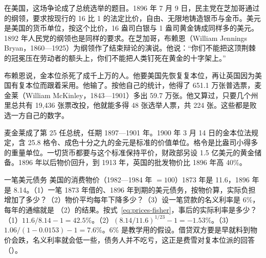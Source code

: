
在美国，这场争论成了总统选举的题目。1896 年 7 月 9 日，民主党在芝加哥通过的纲领，要求按现行的 16 比 1 的法定比价，自由、无限地铸造银币与金币\cite{bryan1896}。美元是美国的货币单位，按这个比价，16 盎司白银与 1 盎司黄金铸成同样多的美元。1892 年人民党的纲领也是同样的要求\cite{bryan1896}。在芝加哥，布赖恩（William Jennings Bryan，1860—1925）为纲领作了结束辩论的演说\cite{bryan1896,wikisourceauthors}。他说：“你们不能把这顶荆棘的冠冕压在劳动者的额头上，你们不能把人类钉死在黄金的十字架上。”\cite{bryan1896}

布赖恩说，金本位杀死了成千上万的人\cite{bryan1896}。他要美国先恢复复本位，再让英国因为美国有复本位而跟着采用\cite{bryan1896}。他输了。按他自己的统计，他得了 651.1 万张普选票，麦金莱（William McKinley，1843—1901）多出 59.7 万张\cite{bryan1896,wikisourceauthors}。他又算过，只要几个州里总共有 19,436 张票改投，他就能多得 48 张选举人票，共 224 张\cite{bryan1896}。这些都是败选一方自己的数字。

麦金莱成了第 25 任总统，任期 1897—1901 年\cite{wikisourceauthors}。1900 年 3 月 14 日的金本位法规定，含 25.8 格令、成色十分之九的金元是标准的价值单位\cite{huntington1910}。格令是比盎司小得多的重量单位。一切货币都要与这个标准保持平价，财政部另设 1.5 亿美元的黄金储备\cite{huntington1910}。1896 年以后物价回升，到 1913 年，英国的批发物价比 1896 年高 40\%\cite{boe2017}。

\begin{example}{一笔美元债务}\label{ex:gold-debt}
美国的消费物价（1982—1984 年 $=100$）1873 年是 11.6，1896 年是 8.14\cite{boe2017}。（1）一笔 1873 年借的、1896 年到期的美元债务，按物价算，实际负担增加了多少？（2）物价平均每年下降多少？（3）设一笔贷款的名义利率是 6\%，每年的通缩就是 （2）的结果。按式~\eqref{eq:prices-fisher}，事后的实际利率是多少？
\solution （1）$11.6/8.14-1=42.5\%$。（2）$(8.14/11.6)^{1/23}-1=-1.53\%$。（3）$1.06/(1-0.0153)-1=7.6\%$。6\% 是教学用的假设。借贷双方要是早就料到物价会跌，名义利率就会低一些，债务人并不吃亏，这正是费雪对复本位派的回答（）。
\end{example}


